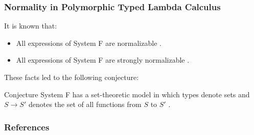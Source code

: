 \begin{frame}[fragile]
    \frametitle{Normality in Polymorphic Typed Lambda Calculus}
  
    It is known that:
    \begin{itemize}
        \item All expressions of System F are normalizable \cite{girard1972phd}.
        \item All expressions of System F are strongly normalizable \cite{PRAWITZ1971235}.
    \end{itemize}

    These facts led to the following conjecture:
    \begin{alertblock}{Conjecture}
		System F has a set-theoretic model in which types denote sets and $S \rightarrow S'$ denotes the set of all functions from $S$ to $S'$ \cite{reynolds1983types}.
	\end{alertblock}
\end{frame}

\begin{frame}[t,allowframebreaks]
\nocite{*}
\frametitle{References}


\end{frame}
